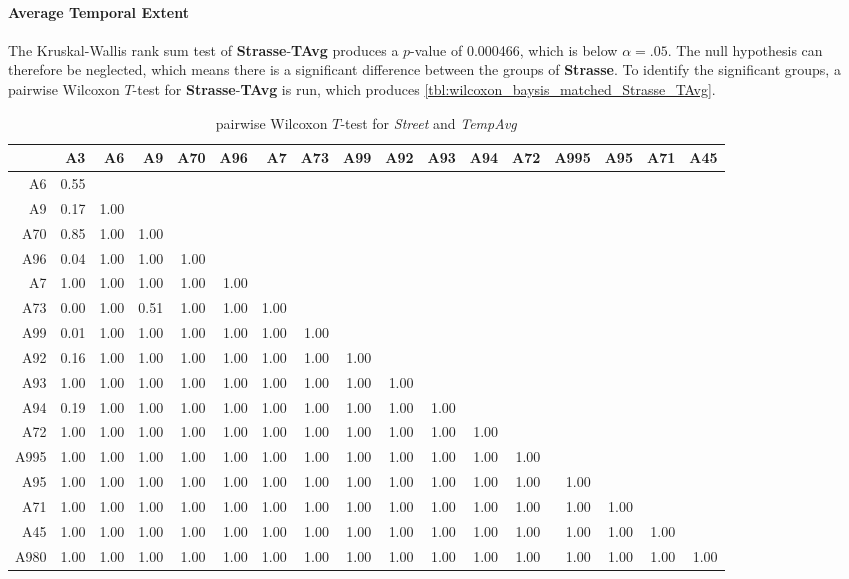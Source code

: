 \paragraph{Average Temporal Extent}
The Kruskal-Wallis rank sum test of \textbf{Strasse}-\textbf{TAvg} produces a $p$-value of 0.000466, which is below $\alpha=.05$. The null hypothesis can therefore be neglected, which means there is a significant difference between the groups of \textbf{Strasse}. To identify the significant groups, a pairwise Wilcoxon $T$-test for \textbf{Strasse}-\textbf{TAvg} is run, which produces \autoref{tbl:wilcoxon_baysis_matched_Strasse_TAvg}. 
\begin{table}[ht]
	\tiny
	\setlength{\tabcolsep}{4pt}
	\centering
	\begin{tabular}{rrrrrrrrrrrrrrrrr}
		\toprule
				& A3 & A6 & A9 & A70 & A96 & A7 & A73 & A99 & A92 & A93 & A94 & A72 & A995 & A95 & A71 & A45 \\ 
		\midrule
		A6 		& 0.55 &  &  &  &  &  &  &  &  &  &  &  &  &  &  &  \\ 
		A9 		& 0.17 & 1.00 &  &  &  &  &  &  &  &  &  &  &  &  &  &  \\ 
		A70		& 0.85 & 1.00 & 1.00 &  &  &  &  &  &  &  &  &  &  &  &  &  \\ 
		A96 	& 0.04 & 1.00 & 1.00 & 1.00 &  &  &  &  &  &  &  &  &  &  &  &  \\ 
		A7 		& 1.00 & 1.00 & 1.00 & 1.00 & 1.00 &  &  &  &  &  &  &  &  &  &  &  \\ 
		A73 	& 0.00 & 1.00 & 0.51 & 1.00 & 1.00 & 1.00 &  &  &  &  &  &  &  &  &  &  \\ 
		A99 	& 0.01 & 1.00 & 1.00 & 1.00 & 1.00 & 1.00 & 1.00 &  &  &  &  &  &  &  &  &  \\ 
		A92 	& 0.16 & 1.00 & 1.00 & 1.00 & 1.00 & 1.00 & 1.00 & 1.00 &  &  &  &  &  &  &  &  \\ 
		A93 	& 1.00 & 1.00 & 1.00 & 1.00 & 1.00 & 1.00 & 1.00 & 1.00 & 1.00 &  &  &  &  &  &  &  \\ 
		A94 	& 0.19 & 1.00 & 1.00 & 1.00 & 1.00 & 1.00 & 1.00 & 1.00 & 1.00 & 1.00 &  &  &  &  &  &  \\ 
		A72 	& 1.00 & 1.00 & 1.00 & 1.00 & 1.00 & 1.00 & 1.00 & 1.00 & 1.00 & 1.00 & 1.00 &  &  &  &  &  \\ 
		A995 	& 1.00 & 1.00 & 1.00 & 1.00 & 1.00 & 1.00 & 1.00 & 1.00 & 1.00 & 1.00 & 1.00 & 1.00 &  &  &  &  \\ 
		A95 	& 1.00 & 1.00 & 1.00 & 1.00 & 1.00 & 1.00 & 1.00 & 1.00 & 1.00 & 1.00 & 1.00 & 1.00 & 1.00 &  &  &  \\ 
		A71		& 1.00 & 1.00 & 1.00 & 1.00 & 1.00 & 1.00 & 1.00 & 1.00 & 1.00 & 1.00 & 1.00 & 1.00 & 1.00 & 1.00 &  &  \\ 
		A45 	& 1.00 & 1.00 & 1.00 & 1.00 & 1.00 & 1.00 & 1.00 & 1.00 & 1.00 & 1.00 & 1.00 & 1.00 & 1.00 & 1.00 & 1.00 &  \\ 
		A980 	& 1.00 & 1.00 & 1.00 & 1.00 & 1.00 & 1.00 & 1.00 & 1.00 & 1.00 & 1.00 & 1.00 & 1.00 & 1.00 & 1.00 & 1.00 & 1.00 \\
		\bottomrule
	\end{tabular}
	\caption{pairwise Wilcoxon $T$-test for \textit{Street} and \textit{TempAvg}}
	\label{tbl:wilcoxon_baysis_matched_Strasse_TAvg}
\end{table}
